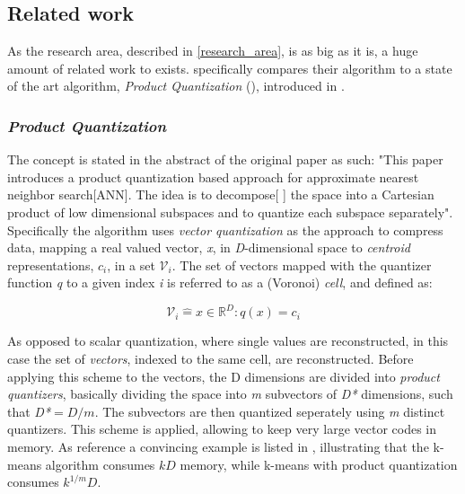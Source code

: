 \subsection{Related work}
\label{state_of_the_art}
As the research area, described in \ref{research_area}, is as big as it is, a huge amount of related work to \qs{} exists. \cite{wagner17} specifically compares their algorithm to a state of the art algorithm, \textit{Product Quantization} (\pq{}), introduced in \cite{schmid9}. 

\subsubsection{\textit{Product Quantization}}
The \pq{} concept is stated in the abstract of the original paper as such: "This paper introduces a product quantization based approach for approximate nearest neighbor search[ANN]. The idea is to decompose[ ] the space into a Cartesian product of low dimensional subspaces and to quantize each subspace separately". Specifically the algorithm uses \textit{vector quantization} as the approach to compress data, mapping a real valued vector, \textit{x}, in \textit{D}-dimensional space to \textit{centroid} representations, \textit{$c_i$}, in a set $\mathcal{V}_i$\cite[p.3 II-A]{schmid9}. The set of vectors mapped with the quantizer function \textit{q} to a given index \textit{i} is referred to as a (Voronoi) \textit{cell}, and defined as:

\begin{equation}
	\mathcal{V}_i\mathrel{\hat=}{x\in\mathbb{R}^D : q(x)=c_i}
\end{equation}

As opposed to scalar quantization, where single values are reconstructed, in this case the set of \textit{vectors}, indexed to the same cell, are reconstructed. Before applying this scheme to the vectors, the D dimensions are divided into \textit{product quantizers}, basically dividing the space into \textit{m} subvectors of \textit{D*} dimensions, such that \textit{D*$=D/m$}\cite[p.3 II-B]{schmid9}. The subvectors are then quantized seperately using \textit{m} distinct quantizers. This scheme is applied, allowing to keep very large vector codes in memory. As reference a convincing example is listed in \cite[Table I, p. 4]{schmid9}, illustrating that the k-means algorithm consumes $kD$ memory, while k-means with product quantization consumes  $k^{1/m}D$.

